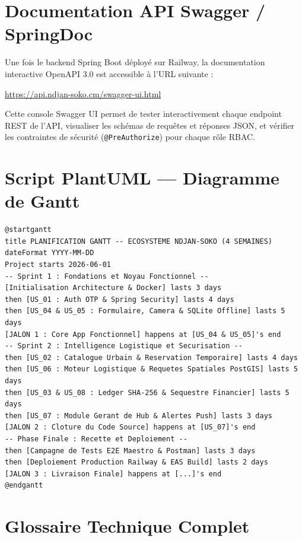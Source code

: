\documentclass[12pt,a4paper]{report}
\begin{document}
\chapter{Documentation API Swagger / SpringDoc}

Une fois le backend Spring Boot déployé sur Railway, la documentation interactive OpenAPI 3.0 est accessible à l'URL suivante :

\url{https://api.ndjan-soko.cm/swagger-ui.html}

Cette console Swagger UI permet de tester interactivement chaque endpoint REST de l'API, visualiser les schémas de requêtes et réponses JSON, et vérifier les contraintes de sécurité (\texttt{@PreAuthorize}) pour chaque rôle RBAC.

\chapter{Script PlantUML — Diagramme de Gantt}

\begin{lstlisting}[language={},caption={Script PlantUML — Planification Gantt 4 semaines}]
@startgantt
title PLANIFICATION GANTT -- ECOSYSTEME NDJAN-SOKO (4 SEMAINES)
dateFormat YYYY-MM-DD
Project starts 2026-06-01
-- Sprint 1 : Fondations et Noyau Fonctionnel --
[Initialisation Architecture & Docker] lasts 3 days
then [US_01 : Auth OTP & Spring Security] lasts 4 days
then [US_04 & US_05 : Formulaire, Camera & SQLite Offline] lasts 5 days
[JALON 1 : Core App Fonctionnel] happens at [US_04 & US_05]'s end
-- Sprint 2 : Intelligence Logistique et Securisation --
then [US_02 : Catalogue Urbain & Reservation Temporaire] lasts 4 days
then [US_06 : Moteur Logistique & Requetes Spatiales PostGIS] lasts 5 days
then [US_03 & US_08 : Ledger SHA-256 & Sequestre Financier] lasts 5 days
then [US_07 : Module Gerant de Hub & Alertes Push] lasts 3 days
[JALON 2 : Cloture du Code Source] happens at [US_07]'s end
-- Phase Finale : Recette et Deploiement --
then [Campagne de Tests E2E Maestro & Postman] lasts 3 days
then [Deploiement Production Railway & EAS Build] lasts 2 days
[JALON 3 : Livraison Finale] happens at [...]'s end
@endgantt
\end{lstlisting}

\chapter{Glossaire Technique Complet}
\end{document}
